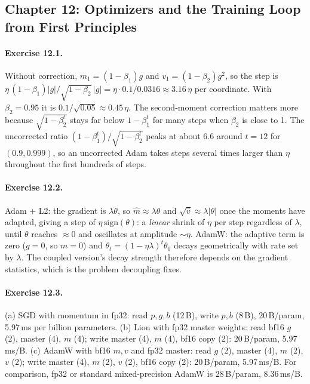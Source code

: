 \subsection*{Chapter 12: Optimizers and the Training Loop from First Principles}

\paragraph{Exercise 12.1.} Without correction, $m_1=(1-\beta_1)g$ and $v_1=(1-\beta_2)g^2$, so
the step is $\eta\,(1-\beta_1)|g|/\sqrt{1-\beta_2}\,|g| = \eta\cdot0.1/0.0316\approx3.16\,\eta$
per coordinate. With $\beta_2=0.95$ it is $0.1/\sqrt{0.05}\approx0.45\,\eta$. The second-moment
correction matters more because $\sqrt{1-\beta_2^t}$ stays far below $1-\beta_1^t$ for many
steps when $\beta_2$ is close to 1. The uncorrected ratio $(1-\beta_1^t)/\sqrt{1-\beta_2^t}$
peaks at about $6.6$ around $t=12$ for $(0.9, 0.999)$, so an uncorrected Adam takes steps
several times larger than $\eta$ throughout the first hundreds of steps.

\paragraph{Exercise 12.2.} Adam + L2: the gradient is $\lambda\theta$, so $\hat m\approx\lambda\theta$
and $\sqrt{\hat v}\approx\lambda|\theta|$ once the moments have adapted, giving a step of
$\eta\,\mathrm{sign}(\theta)$: a \emph{linear} shrink of $\eta$ per step regardless of $\lambda$,
until $\theta$ reaches $\approx0$ and oscillates at amplitude $\sim\eta$. AdamW: the adaptive
term is zero ($g=0$, so $m=0$) and $\theta_t=(1-\eta\lambda)^t\theta_0$ decays geometrically with
rate set by $\lambda$. The coupled version's decay strength therefore depends on the gradient
statistics, which is the problem decoupling fixes.

\paragraph{Exercise 12.3.} (a) SGD with momentum in fp32: read $p,g,b$ (12\,B), write $p,b$
(8\,B), 20\,B/param, 5.97\,ms per billion parameters. (b) Lion with fp32 master weights: read bf16
$g$ (2), master (4), $m$ (4); write master (4), $m$ (4), bf16 copy (2): 20\,B/param, 5.97\,ms/B.
(c) AdamW with bf16 $m,v$ and fp32 master: read $g$ (2), master (4), $m$ (2), $v$ (2); write
master (4), $m$ (2), $v$ (2), bf16 copy (2): 20\,B/param, 5.97\,ms/B. For comparison, fp32 or
standard mixed-precision AdamW is 28\,B/param, 8.36\,ms/B.

